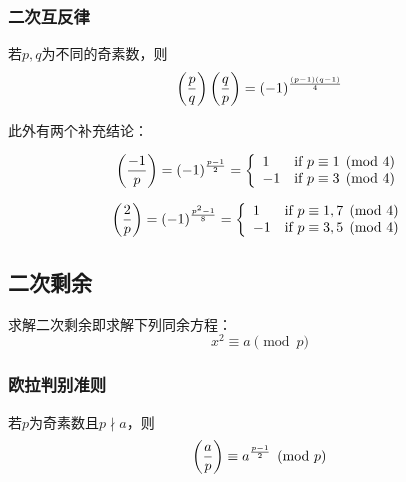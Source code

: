 \subsubsection{二次互反律}
\begin{theorem}
	若$p,q$为不同的奇素数，则
	\begin{displaymath}
		\left(\frac{p}{q}\right)\left(\frac{q}{p}\right)=(-1)^\frac{(p-1)(q-1)}{4}
	\end{displaymath}
\end{theorem}
此外有两个补充结论：
\begin{theorem}
    \begin{displaymath}
        \left(\frac{-1}{p}\right)=(-1)^\frac{p-1}{2}=\left\{\begin{array}{lr}
            1 & \textrm{if~} p\equiv 1\pmod{4}\\
            -1 & \textrm{if~} p\equiv 3\pmod{4}\\
        \end{array}\right.
    \end{displaymath}
\end{theorem}
\begin{theorem}
    \begin{displaymath}
        \left(\frac{2}{p}\right)=(-1)^\frac{p^2-1}{8}=\left\{\begin{array}{lr}
            1 & \textrm{if~} p\equiv 1,7\pmod{4}\\
            -1 & \textrm{if~} p\equiv 3,5\pmod{4}\\
        \end{array}\right.
    \end{displaymath}
\end{theorem}
\subsection{二次剩余}
求解二次剩余即求解下列同余方程：
\begin{displaymath}
	x^2\equiv a \pmod{p}
\end{displaymath}
\subsubsection{欧拉判别准则}
\begin{theorem}
    若$p$为奇素数且$p\nmid a$，则
    \begin{displaymath}
        \left(\frac{a}{p}\right)\equiv a^\frac{p-1}{2}\pmod{p}
    \end{displaymath}
\end{theorem}
